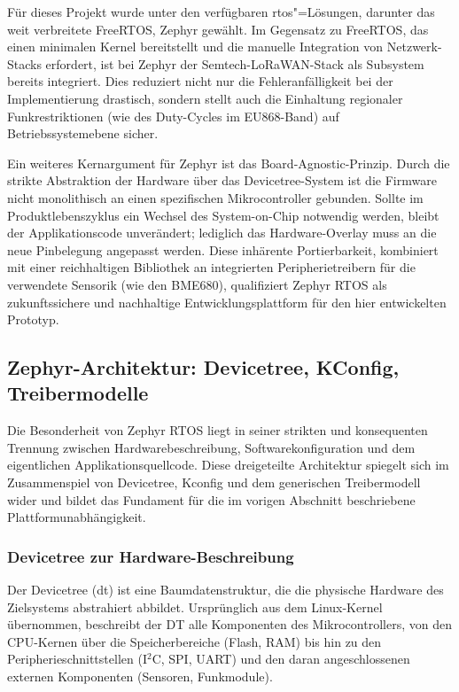 Für dieses Projekt wurde unter den verfügbaren \acrshort{rtos}"=Lösungen, darunter das weit verbreitete FreeRTOS, Zephyr gewählt.
Im Gegensatz zu FreeRTOS, das einen minimalen Kernel bereitstellt und die manuelle Integration von Netzwerk-Stacks 
erfordert, ist bei Zephyr der Semtech-LoRaWAN-Stack als Subsystem bereits integriert. 
Dies reduziert nicht nur die Fehleranfälligkeit bei der Implementierung drastisch, sondern stellt auch die Einhaltung 
regionaler Funkrestriktionen (wie des Duty-Cycles im EU868-Band) auf Betriebssystemebene sicher.

Ein weiteres Kernargument für Zephyr ist das Board-Agnostic-Prinzip. Durch die strikte Abstraktion der Hardware 
über das Devicetree-System ist die Firmware nicht monolithisch an einen spezifischen Mikrocontroller gebunden. 
Sollte im Produktlebenszyklus ein Wechsel des System-on-Chip notwendig werden, bleibt der Applikationscode unverändert; 
lediglich das Hardware-Overlay muss an die neue Pinbelegung angepasst werden. Diese inhärente Portierbarkeit, kombiniert mit 
einer reichhaltigen Bibliothek an integrierten Peripherietreibern für die verwendete Sensorik (wie den BME680), 
qualifiziert Zephyr RTOS als zukunftssichere und nachhaltige Entwicklungsplattform für den hier entwickelten Prototyp.

\subsection{Zephyr-Architektur: Devicetree, KConfig, Treibermodelle}

Die Besonderheit von Zephyr RTOS liegt in seiner strikten und konsequenten Trennung zwischen Hardwarebeschreibung, 
Softwarekonfiguration und dem eigentlichen Applikationsquellcode. Diese dreigeteilte Architektur spiegelt sich im 
Zusammenspiel von Devicetree, Kconfig und dem generischen Treibermodell wider und bildet das Fundament 
für die im vorigen Abschnitt beschriebene Plattformunabhängigkeit.

\subsubsection{Devicetree zur Hardware-Beschreibung}

Der Devicetree (\acrshort{dt}) ist eine Baumdatenstruktur, die die physische Hardware des Zielsystems abstrahiert abbildet. 
Ursprünglich aus dem Linux-Kernel übernommen, beschreibt der DT alle Komponenten des Mikrocontrollers, von den CPU-Kernen über die 
Speicherbereiche (Flash, RAM) bis hin zu den Peripherieschnittstellen (I$^2$C, SPI, UART) und den daran angeschlossenen 
externen Komponenten (Sensoren, Funkmodule).

